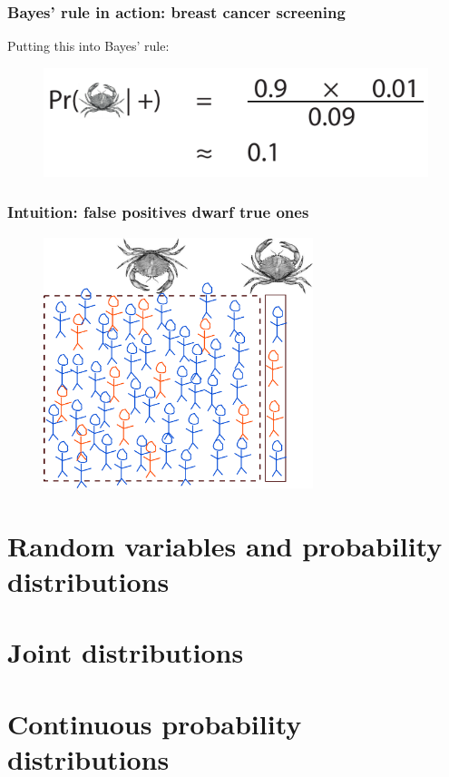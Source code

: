 \documentclass{beamer}
\begin{document}
	\begin{frame}
		\frametitle{Bayes' rule in action: breast cancer screening}
		Putting this into Bayes' rule:
		
		\begin{figure}[ht]
			\includegraphics[width=1\textwidth]{./figures/lec1_cancer4.pdf}
		\end{figure}
		
	\end{frame}

	\begin{frame}
		\frametitle{Intuition: false positives dwarf true ones}
		
		\begin{figure}[ht]
			\includegraphics[width=0.7\textwidth]{./figures/breast_cancer_intuition.pdf}
		\end{figure}
		
		
	\end{frame}
	

	\section{Random variables and probability distributions}


	\section{Joint distributions}
	\frame{\tableofcontents[currentsection]}
	
	\section{Continuous probability distributions}
	\frame{\tableofcontents[currentsection]}
	
\end{document}
